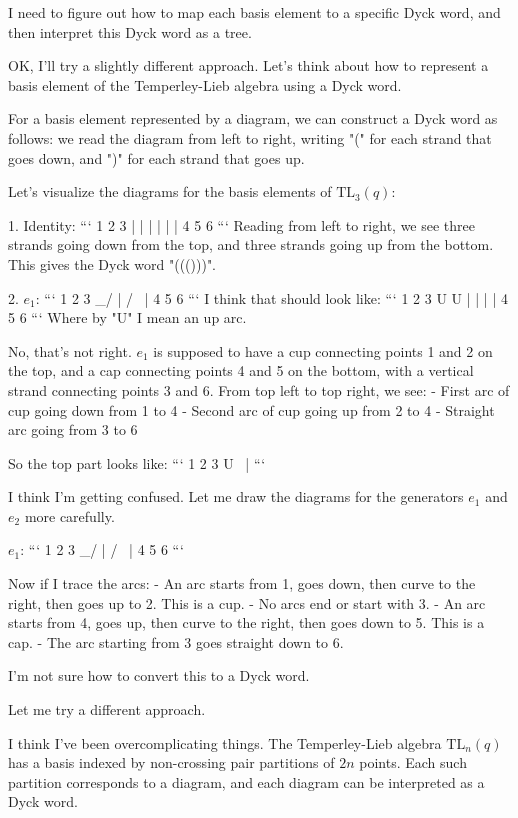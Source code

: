 \documentclass[12p]{article}
\newcounter{reasoningcounter}
\newenvironment{reasoning}[1][]
{\refstepcounter{reasoningcounter}%
\begin{tcolorbox}[
    title=Reasoning \thereasoningcounter: #1,
    colback=white, %
    colframe=gray,
    coltext=black, %
    fonttitle=\bfseries\normalsize,
    top=2mm,
    bottom=2mm,
    enlarge top initially by=5mm
]
\small
}
{\end{tcolorbox}}
\begin{document}
\begin{reasoning}
I need to figure out how to map each basis element to a specific Dyck word, and then interpret this Dyck word as a tree.

OK, I'll try a slightly different approach. Let's think about how to represent a basis element of the Temperley-Lieb algebra using a Dyck word.

For a basis element represented by a diagram, we can construct a Dyck word as follows: we read the diagram from left to right, writing "(" for each strand that goes down, and ")" for each strand that goes up.

Let's visualize the diagrams for the basis elements of $\text{TL}_3(q)$:

1. Identity:
```
1 2 3
| | |
| | |
4 5 6
```
Reading from left to right, we see three strands going down from the top, and three strands going up from the bottom. This gives the Dyck word "((()))".

2. $e_1$:
```
1 2 3
 \_/ |
 / \ |
4 5 6
```
I think that should look like:
```
1 2 3
U U |
| | |
4 5 6
```
Where by "U" I mean an up arc. 

No, that's not right. $e_1$ is supposed to have a cup connecting points 1 and 2 on the top, and a cap connecting points 4 and 5 on the bottom, with a vertical strand connecting points 3 and 6. From top left to top right, we see:
- First arc of cup going down from 1 to 4
- Second arc of cup going up from 2 to 4 
- Straight arc going from 3 to 6

So the top part looks like:
```
1   2   3
  U
    \   |
```

I think I'm getting confused. Let me draw the diagrams for the generators $e_1$ and $e_2$ more carefully.

$e_1$:
```
1   2   3
 \_/    |
 / \    |
4   5   6
```

Now if I trace the arcs:
- An arc starts from 1, goes down, then curve to the right, then goes up to 2. This is a cup.
- No arcs end or start with 3.
- An arc starts from 4, goes up, then curve to the right, then goes down to 5. This is a cap.
- The arc starting from 3 goes straight down to 6.

I'm not sure how to convert this to a Dyck word.

Let me try a different approach.

I think I've been overcomplicating things. The Temperley-Lieb algebra $\text{TL}_n(q)$ has a basis indexed by non-crossing pair partitions of $2n$ points. Each such partition corresponds to a diagram, and each diagram can be interpreted as a Dyck word.


\end{reasoning}
\end{document}
